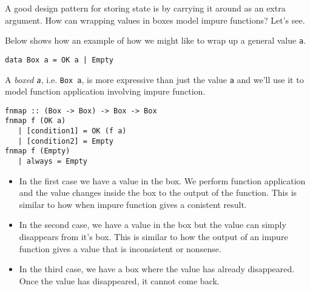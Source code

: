 A good design pattern for storing state is by carrying it around as an extra 
argument.
How can wrapping values in boxes model impure functions? Let's see.



Below shows how an example of how we might like to wrap up a general value \lstinline{a}.
\begin{lstlisting}
data Box a = OK a | Empty
\end{lstlisting}

A \textit{boxed \lstinline{a}}, i.e. \lstinline{Box a}, is more 
expressive than just the value \lstinline{a} and we'll use it to model 
function application involving impure function.

\begin{lstlisting}
fnmap :: (Box -> Box) -> Box -> Box 
fnmap f (OK a) 
   | [condition1] = OK (f a)
   | [condition2] = Empty
fnmap f (Empty)
   | always = Empty
\end{lstlisting}


\begin{itemize}   
\renewcommand{\labelitemi}{$\Box$}
\item In the first case we have a value in the box.
We perform function application and the value changes inside the box to the output 
of the function. This is similar to how when impure function gives a conistent result.
\item In the second case,  we have a value in the box but
 the value can simply disappears from it's box. This is similar 
to how the output of an impure function gives a value that is inconsistent or nonsense. 
\item In the third case, we have a box where the value has 
already disappeared. Once the value has disappeared, it cannot come back. 
\end{itemize}




\begin{figure}[h]
\end{figure}

